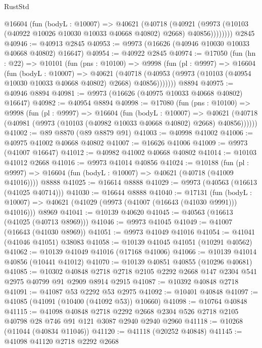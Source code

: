 \begin{lexlean}{RustStd}
\begin{coremodule}
          @16604
            (fun (bodyL : @10007) =>
            @40621
              (@40718
                (@40921
                  (@9973 (@10103 (@40922 @10026 @10030 @10033 @40668 @40802) @2668) @40856))))))))
    @2845
@40946 := @40913 @2845
@40953 := @9973 (@16626 (@40946 @10030 @10033 @40668 @40802) @16647)
@40954 := @40922 @2845
@40974 := @17050
    (fun (hn : @22) =>
    @10101
      (fun (pns : @10100) =>
      @9998
        (fun (pl : @9997) =>
        @16604
          (fun (bodyL : @10007) =>
          @40621
            (@40718 (@40953 (@9973 (@10103 (@40954 @10030 @10033 @40668 @40802) @2668) @40856)))))))
    @8894
@40975 := @40946 @8894
@40981 := @9973 (@16626 (@40975 @10033 @40668 @40802) @16647)
@40982 := @40954 @8894
@40998 := @17080
    (fun (pns : @10100) =>
    @9998
      (fun (pl : @9997) =>
      @16604
        (fun (bodyL : @10007) =>
        @40621 (@40718 (@40981 (@9973 (@10103 (@40982 @10033 @40668 @40802) @2668) @40856))))))
@41002 := @89 @8870 (@89 @8879 @91)
@41003 := @40998 @41002
@41006 := @40975 @41002 @40668 @40802
@41007 := @16626 @41006
@41009 := @9973 (@41007 @16647)
@41012 := @40982 @41002 @40668 @40802
@41014 := @10103 @41012 @2668
@41016 := @9973 @41014 @40856
@41024 := @10188
    (fun (pl : @9997) => @16604 (fun (bodyL : @10007) => @40621 (@40718 (@41009 @41016))))
    @8888
@41025 := @16614 @8888
@41029 := @9973 (@40563 (@16613 (@41025 @40714)))
@41030 := @16644 @8888
@41040 := @17131
    (fun (bodyL : @10007) => @40621 (@41029 (@9973 (@41007 (@16643 (@41030 @9991))) @41016)))
    @8969
@41041 := @10139 @40620
@41045 := @40563 (@16613 (@41025 (@40713 @8969)))
@41046 := @9973 @41045
@41049 := @41007 (@16643 (@41030 @8969))
@41051 := @9973 @41049 @41016
@41054 := @41041 (@41046 @41051) @38083
@41058 := @10139 @41045 @41051 (@10291 @40562)
@41062 := @10139 @41049 @41016 (@17168 @41006)
@41066 := @10139 @41014 @40856 (@10441 @41012)
@41070 := @10139 @40851 @40855 (@10296 @40681)
@41085 := @10302
    @40848
    @2718
    @2718
    @2105
    @2292
    @2668
    @147
    @2304
    @541
    @2975
    @40799
    @91
    @2909
    @8914
    @2915
@41087 := @10392 @40848 @2718
@41091 := @41087 @53 @2292 @53 @2975
@41092 := @10401 @40848
@41097 := @41085 (@41091 (@10400 (@41092 @53)) @10660)
@41098 := @10764 @40848
@41115 := @41098
    @40848
    @2718
    @2292
    @2668
    @2304
    @526
    @2718
    @2105
    @40798
    @28
    @746
    @91
    @121
    @3087
    @2940
    @2940
    @2960
@41118 := @10268 (@11044 (@40834 @11046))
@41120 := @41118 (@20252 @40848)
@41145 := @41098
    @41120
    @2718
    @2292
    @2668

\end{coremodule}
\end{lexlean}
